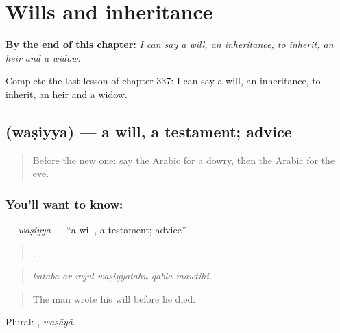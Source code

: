 
\chapter{Wills and inheritance}
\label{ch:ar-wills-and-inheritance}

\begin{chapteropening}
\textbf{By the end of this chapter:} \emph{I can say a will, an inheritance, to inherit, an heir and a widow.}

Complete the last lesson of chapter 337: I can say a will, an inheritance, to inherit, an heir and a widow.
\end{chapteropening}

\section[\texorpdfstring{\ar{وصية} (waṣiyya)}{وصية (waṣiyya)}]{ (waṣiyya) — a will, a testament; advice}

\label{lesson:AR-C337-wasiyya}



\begin{quote}
Before the new one: say the Arabic for a dowry, then the Arabic for the eve.
\end{quote}

\subsection*{You'll want to know: }
\textbf{} — \emph{waṣiyya} — \textquotedblleft{}a will, a testament; advice\textquotedblright{}.

\begin{quote}
    .
\end{quote}

\begin{quote}
\emph{kataba ar-rajul waṣiyyatahu qabla mawtihi.}
\end{quote}

\begin{quote}
The man wrote his will before he died.
\end{quote}

Plural: , \emph{waṣāyā}.

